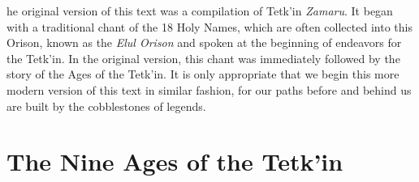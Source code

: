 \bigskip

\lettrine[findent=2pt]{}{ }he original version of this text was a compilation of Tetk’in \textit{Zamaru}. It began with a traditional chant of the 18 Holy Names, which are often collected into this Orison, known as the \textit{Elul Orison} and spoken at the beginning of endeavors for the Tetk'in. In the original version, this chant was immediately followed by the story of the Ages of the Tetk'in. It is only appropriate that we begin this more modern version of this text in similar fashion, for our paths before and behind us are built by the cobblestones of legends. 

\section{The Nine Ages of the Tetk'in}



\clearpage


